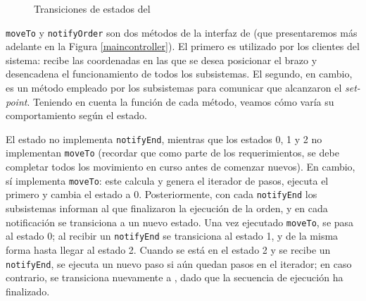 \begin{figure}[H]
\caption{Transiciones de estados del \MainController}
\label{statesMainController}
\begin{center}
\end{center}
\end{figure}

\verb|moveTo| y \verb|notifyOrder| son dos métodos de la interfaz de \MainController (que presentaremos más adelante en la Figura \ref{maincontroller}). El primero es utilizado por los clientes del sistema: recibe las coordenadas en las que se desea posicionar el brazo y desencadena el funcionamiento de todos los subsistemas. El segundo, en cambio, es un método empleado por los subsistemas para comunicar que alcanzaron el \textit{set-point}. Teniendo en cuenta la función de cada método, veamos cómo varía su comportamiento según el estado.

El estado \Waiting no implementa \verb|notifyEnd|, mientras que los estados 0, 1 y 2 no implementan \verb|moveTo| (recordar que como parte de los requerimientos, se debe completar todos los movimiento en curso antes de comenzar nuevos). En cambio, \Waiting sí implementa \verb|moveTo|: este calcula y genera el iterador de pasos, ejecuta el primero y cambia el estado a 0. Posteriormente, con cada \verb|notifyEnd| los subsistemas informan al \MainController que finalizaron la ejecución de la orden, y en cada notificación se transiciona a un nuevo estado. Una vez ejecutado \verb|moveTo|, se pasa al estado 0; al recibir un \verb|notifyEnd| se transiciona al estado 1, y de la misma forma hasta llegar al estado 2. Cuando se está en el estado 2 y se recibe un \verb|notifyEnd|, se ejecuta un nuevo paso si aún quedan pasos en el iterador; en caso contrario, se transiciona nuevamente a \Waiting, dado que la secuencia de ejecución ha finalizado.


